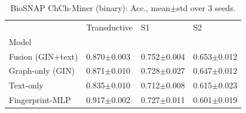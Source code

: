 \begin{table}[t]
\caption{BioSNAP ChCh-Miner (binary): Acc., mean$\pm$std over 3 seeds.}
\label{tab:biosnap-accuracy}
\begin{tabular}{llll}
\toprule
 & Transductive & S1 & S2 \\
Model &  &  &  \\
\midrule
Fusion (GIN+text) & 0.870$\pm$0.003 & 0.752$\pm$0.004 & 0.653$\pm$0.012 \\
Graph-only (GIN) & 0.871$\pm$0.010 & 0.728$\pm$0.027 & 0.647$\pm$0.012 \\
Text-only & 0.835$\pm$0.010 & 0.712$\pm$0.008 & 0.615$\pm$0.023 \\
Fingerprint-MLP & 0.917$\pm$0.002 & 0.727$\pm$0.011 & 0.601$\pm$0.019 \\
\bottomrule
\end{tabular}
\end{table}
